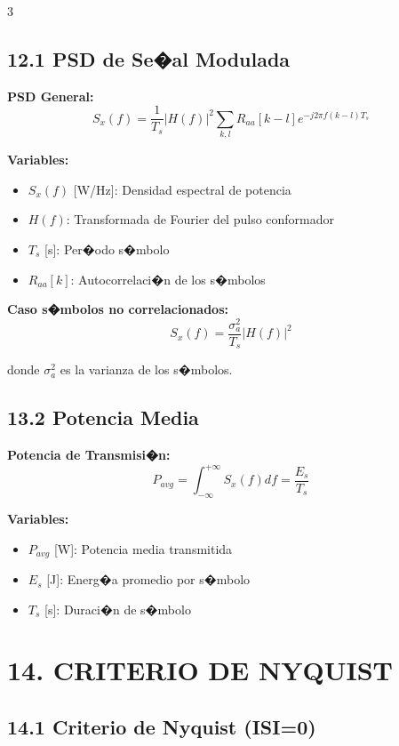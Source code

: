﻿\documentclass[8pt,a4paper]{article}
\begin{document}
\begin{multicols}{3}
\subsection*{\small 12.1 PSD de Se�al Modulada}
\vspace{-2mm}

\textbf{PSD General:}
\[
S_x(f) = \frac{1}{T_s} |H(f)|^2 \sum_{k,l} R_{aa}[k-l] e^{-j2\pi f(k-l)T_s}
\]

\textbf{Variables:}
\begin{itemize}[leftmargin=*,itemsep=0pt]
    \item $S_x(f)$ [W/Hz]: Densidad espectral de potencia
    \item $H(f)$: Transformada de Fourier del pulso conformador
    \item $T_s$ [s]: Per�odo s�mbolo
    \item $R_{aa}[k]$: Autocorrelaci�n de los s�mbolos
\end{itemize}

\textbf{Caso s�mbolos no correlacionados:}
\[
S_x(f) = \frac{\sigma_a^2}{T_s} |H(f)|^2
\]

donde $\sigma_a^2$ es la varianza de los s�mbolos.

\vspace{-2mm}
\subsection*{\small 13.2 Potencia Media}
\vspace{-2mm}

\textbf{Potencia de Transmisi�n:}
\[
P_{avg} = \int_{-\infty}^{+\infty} S_x(f) df = \frac{E_s}{T_s}
\]

\textbf{Variables:}
\begin{itemize}[leftmargin=*,itemsep=0pt]
    \item $P_{avg}$ [W]: Potencia media transmitida
    \item $E_s$ [J]: Energ�a promedio por s�mbolo
    \item $T_s$ [s]: Duraci�n de s�mbolo
\end{itemize}

\vspace{-2mm}
\section*{\color{sectioncolor}\normalsize 14. CRITERIO DE NYQUIST}
\vspace{-3mm}

\subsection*{\small 14.1 Criterio de Nyquist (ISI=0)}
\vspace{-2mm}


\end{multicols}
\end{document}
